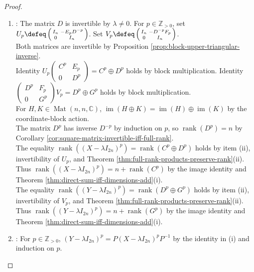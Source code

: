 \begin{theorem}
\begin{proof}
\begin{enumerate}[label=(\roman*)]
Hence $(\forall\,p\in\mathbb{Z}_{>0})\,\mathcal{P}_p$ by Theorem \ref{thm:mathematical-induction}.
\item {}: The matrix $D$ is invertible by $\lambda\neq0$. For $p\in\mathbb{Z}_{>0}$, set $U_p\defeq\left(\begin{smallmatrix}I_n&-E_pD^{-p}\\0&I_n\end{smallmatrix}\right)$. Set $V_p\defeq\left(\begin{smallmatrix}I_n&-D^{-p}F_p\\0&I_n\end{smallmatrix}\right)$.\\
Both matrices are invertible by Proposition \ref{prop:block-upper-triangular-inverse}.\\
Identity $U_p\left(\begin{smallmatrix}C^p&E_p\\0&D^p\end{smallmatrix}\right)=C^p\oplus D^p$ holds by block multiplication. Identity $\left(\begin{smallmatrix}D^p&F_p\\0&G^p\end{smallmatrix}\right)V_p=D^p\oplus G^p$ holds by block multiplication.\\
For $H,K\in\operatorname{Mat}(n,n,\mathbb{C})$, $\operatorname{im}(H\oplus K)=\operatorname{im}(H)\oplus\operatorname{im}(K)$ by the coordinate-block action.\\
The matrix $D^p$ has inverse $D^{-p}$ by induction on $p$, so $\operatorname{rank}(D^p)=n$ by Corollary \ref{cor:square-matrix-invertible-iff-full-rank}.\\
The equality $\operatorname{rank}((X-\lambda I_{2n})^p)=\operatorname{rank}(C^p\oplus D^p)$ holds by item (ii), invertibility of $U_p$, and Theorem \ref{thm:full-rank-products-preserve-rank}(ii).\\
Thus $\operatorname{rank}((X-\lambda I_{2n})^p)=n+\operatorname{rank}(C^p)$ by the image identity and Theorem \ref{thm:direct-sum-iff-dimensions-add}(i).\\
The equality $\operatorname{rank}((Y-\lambda I_{2n})^p)=\operatorname{rank}(D^p\oplus G^p)$ holds by item (ii), invertibility of $V_p$, and Theorem \ref{thm:full-rank-products-preserve-rank}(ii).\\
Thus $\operatorname{rank}((Y-\lambda I_{2n})^p)=n+\operatorname{rank}(G^p)$ by the image identity and Theorem \ref{thm:direct-sum-iff-dimensions-add}(i).
\item {}: For $p\in\mathbb{Z}_{>0}$, $(Y-\lambda I_{2n})^p=P(X-\lambda I_{2n})^pP^{-1}$ by the identity in (i) and induction on $p$.\\

\end{enumerate}
\end{proof}
\end{theorem}
